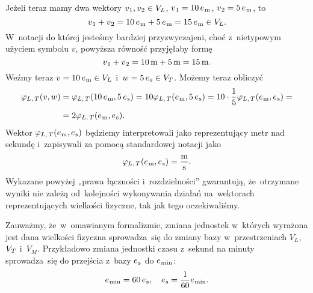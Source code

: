 \documentclass[a4paper,11pt]{article}
\numberwithin{equation}{section}
\begin{document}
Jeżeli teraz mamy dwa wektory
$v_{ \HorSpaceOne 1 }, v_{ \HorSpaceOne 2 } \in V_{ L }$,
$v_{ \HorSpaceOne 1 } = 10 \, e_{ \HorSpaceOne \si{m} }$,
$v_{ \HorSpaceOne 2 } = 5 \, e_{ \HorSpaceOne \si{m} }$, to
\begin{equation}
  \label{eq:Mechanika-Rozwazania-ogolne-32}
  v_{ \HorSpaceOne 1 } + v_{ \HorSpaceOne 2 } =
  10 \, e_{ \HorSpaceOne \si{m} } + 5 \, e_{ \HorSpaceOne \si{m} } =
  15 \, e_{ \HorSpaceOne \si{m} } \in V_{ L }.
\end{equation}
W~notacji do której jesteśmy bardziej przyzwyczajeni, choć z~nietypowym
użyciem symbolu $v$, powyższa równość przyjęłaby formę
\begin{equation}
  \label{eq:Mechanika-Rozwazania-ogolne-33}
  v_{ \HorSpaceOne 1 } + v_{ \HorSpaceOne 2 } =
  10 \, \si{m} + 5 \, \si{m} = 15 \, \si{m}.
\end{equation}
Weźmy teraz $v = 10 \, e_{ \HorSpaceOne \si{m} } \in V_{ L }$
i~$w = 5 \, e_{ \HorSpaceOne \si{s} }\in V_{ T }$. Możemy teraz obliczyć
\begin{equation}
  \label{eq:Mechanika-Rozwazania-ogolne-34}
  \begin{split}
    \varphi_{ L, \, T }( v, w )
    &=
      \varphi_{ L, \, T }( 10 \, e_{ \HorSpaceOne \si{m} },
      5 \, e_{ \HorSpaceOne \si{s} } ) =
      10 \varphi_{ L, \, T }( e_{ \HorSpaceOne \si{m} },
      5 \, e_{ \HorSpaceOne \si{s} } ) =
      10 \cdot \frac{ 1 }{ 5 } \varphi_{ L, \, T }( e_{ \HorSpaceOne \si{m} },
      e_{ \HorSpaceOne \si{s} } ) = \\[0.3em]
    &=
      2 \varphi_{ L, \, T }( e_{ \HorSpaceOne \si{m} },
      e_{ \HorSpaceOne \si{s} } ).
  \end{split}
\end{equation}
Wektor $\varphi_{ L, \, T }( e_{ \HorSpaceOne \si{m} }, e_{ \HorSpaceOne \si{s} } )$
będziemy interpretowali jako reprezentujący metr nad sekundę i~zapisywali
za pomocą standardowej notacji jako
\begin{equation}
  \label{eq:Mechanika-Rozwazania-ogolne-29}
  \varphi_{ L, \, T }( e_{ \HorSpaceOne \si{m} }, e_{ \HorSpaceOne \si{s} } ) =
  \frac{ \si{m} }{ \si{s} }.
\end{equation}
Wykazane powyżej „prawa łączności i~rozdzielności”
gwarantują, że~otrzymane wyniki nie zależą od~kolejności wykonywania
działań na~wektorach reprezentujących wielkości fizyczne, tak jak tego
oczekiwaliśmy.

Zauważmy, że~w~omawianym formalizmie, zmiana jednostek w~których wyrażona
jest dana wielkości fizyczna sprowadza~się do zmiany bazy w~przestrzeniach
$V_{ L }$, $V_{ \HorSpaceOne T }$ i~$V_{ M }$. Przykładowo zmiana jednostki
czasu z~sekund na minuty sprowadza~się do przejścia z~bazy
$e_{ \HorSpaceOne \si{s} }$ do $e_{ \HorSpaceOne \si{min} }$:
\begin{equation}
  \label{eq:Mechanika-Rozwazania-ogolne-30}
  e_{ \HorSpaceOne \si{min} } = 60 \, e_{ \HorSpaceOne \si{s} }, \quad
  e_{ \HorSpaceOne \si{s} } = \frac{ 1 }{ 60 } e_{ \HorSpaceOne \si{min} }.
\end{equation}
\end{document}
